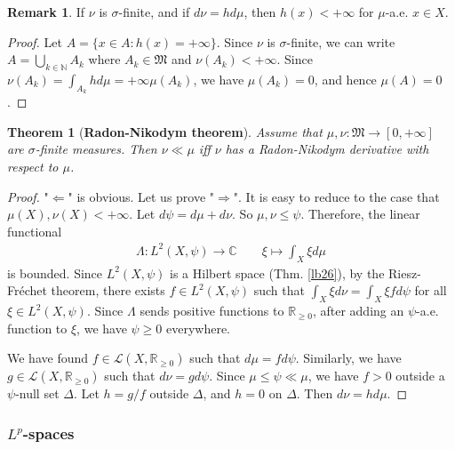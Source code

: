 \documentclass[12pt,b5paper,notitlepage]{article}
\theoremstyle{definition}
\newtheorem{rem}[df]{Remark}
\theoremstyle{plain}
\newtheorem{thm}[df]{Theorem}
\newcommand{\fk}{\mathfrak}
\newcommand{\mc}{\mathcal}
\newcommand{\Cbb}{\mathbb C}
\newcommand{\Nbb}{\mathbb N}
\newcommand{\Rbb}{\mathbb R}
\numberwithin{equation}{section}
\begin{document}
\begin{rem}
If $\nu$ is $\sigma$-finite, and if $d\nu=hd\mu$, then $h(x)<+\infty$ for $\mu$-a.e. $x\in X$. 
\end{rem}

\begin{proof}
Let $A=\{x\in A:h(x)=+\infty\}$. Since $\nu$ is $\sigma$-finite, we can write $A=\bigcup_{k\in\Nbb}A_k$ where $A_k\in\fk M$ and $\nu(A_k)<+\infty$. Since $\nu(A_k)=\int_{A_k}hd\mu=+\infty \mu(A_k)$, we have $\mu(A_k)=0$, and hence $\mu(A)=0$.
\end{proof}





\begin{thm}[\textbf{Radon-Nikodym theorem}]\label{lb27} 
Assume that $\mu,\nu:\fk M\rightarrow[0,+\infty]$ are $\sigma$-finite measures. Then $\nu\ll\mu$ iff $\nu$ has a Radon-Nikodym derivative with respect to $\mu$.
\end{thm}


\begin{proof}[Proof]
"$\Leftarrow$" is obvious. Let us prove "$\Rightarrow$". It is easy to reduce to the case that $\mu(X),\nu(X)<+\infty$. Let $d\psi=d\mu+d\nu$. So $\mu,\nu\leq\psi$. Therefore, the linear functional
\begin{gather*}
\Lambda: L^2(X,\psi)\rightarrow\Cbb\qquad \xi\mapsto \int_X \xi d\mu
\end{gather*}
is bounded. Since $L^2(X,\psi)$ is a Hilbert space (Thm. \ref{lb26}), by the Riesz-Fr\'echet theorem, there exists $f\in L^2(X,\psi)$ such that $\int_X\xi d\nu=\int_X \xi fd\psi$ for all $\xi\in L^2(X,\psi)$. Since $\Lambda$ sends positive functions to $\Rbb_{\geq0}$, after adding an $\psi$-a.e. function to $\xi$, we have $\psi\geq0$ everywhere.


We have found $f\in\mc L(X,\Rbb_{\geq0})$ such that $d\mu=fd\psi$. Similarly, we have $g\in\mc L(X,\Rbb_{\geq0})$ such that $d\nu=gd\psi$.  Since $\mu\leq\psi \ll \mu$, we have $f>0$ outside a $\psi$-null set $\Delta$. Let $h=g/f$ outside $\Delta$, and $h=0$ on $\Delta$. Then $d\nu=hd\mu$. 
\end{proof}












\subsubsection{$L^p$-spaces}
\end{document}
